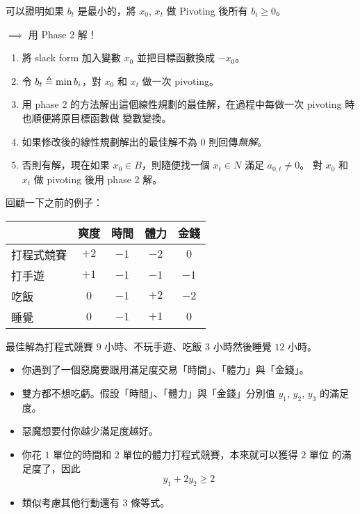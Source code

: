 \documentclass[standalone]{beamer}
\begin{document}
\begin{frame}{}
  可以證明如果 $b_t$ 是最小的，將 $x_0$, $x_t$ 做 Pivoting 後所有 $b_i \geq 0$。
  \bigskip
  \pause

  $\implies$ 用 Phase 2 解！
  \bigskip
  \pause

  \begin{enumerate}[<+->]
    \item 將 slack form 加入變數 $x_0$ 並把目標函數換成 $-x_0$。
    \item 令 $b_t \triangleq \min b_i$，對 $x_0$ 和 $x_t$ 做一次 pivoting。
    \item 用 phase 2 的方法解出這個線性規劃的最佳解，在過程中每做一次 pivoting 時也順便將原目標函數做
      變數變換。
    \item 如果修改後的線性規劃解出的最佳解不為 $0$ 則回傳\emph{無解}。
    \item 否則有解，現在如果 $x_0 \in B$，則隨便找一個 $x_t \in N$ 滿足 $a_{0, t} \neq 0$。
      對 $x_0$ 和 $x_t$ 做 pivoting 後用 phase 2 解。
  \end{enumerate}
\end{frame}

\begin{frame}{}
  回顧一下之前的例子：
  \begin{table}
    \begin{tabular}{|l|c|c|c|c|}
      \hline
      & 爽度 & 時間 & 體力 & 金錢 \\ \hline
      打程式競賽 & $+2$ & $-1$ & $-2$ & $0$ \\ \hline
      打手遊 & $+1$ & $-1$ & $-1$ & $-1$ \\ \hline
      吃飯 & $0$ & $-1$ & $+2$ & $-2$ \\ \hline
      睡覺 & $0$ & $-1$ & $+1$ & $0$ \\ \hline
    \end{tabular}
  \end{table}
  \pause
  \bigskip

  最佳解為打程式競賽 $9$ 小時、不玩手遊、吃飯 $3$ 小時然後睡覺 $12$ 小時。
\end{frame}

\begin{frame}{}
  \begin{itemize}[<+->]
    \item 你遇到了一個惡魔要跟用滿足度交易「時間」、「體力」與「金錢」。
    \item 雙方都不想吃虧。假設「時間」、「體力」與「金錢」分別值 $y_1$, $y_2$, $y_3$ 的滿足度。
    \item 惡魔想要付你越少滿足度越好。
    \item 你花 $1$ 單位的時間和 $2$ 單位的體力打程式競賽，本來就可以獲得 $2$ 單位
的滿足度了，因此
\[ y_1 + 2y_2 \geq 2 \]
    \item 類似考慮其他行動還有 $3$ 條等式。
  \end{itemize}
\end{frame}
\end{document}
